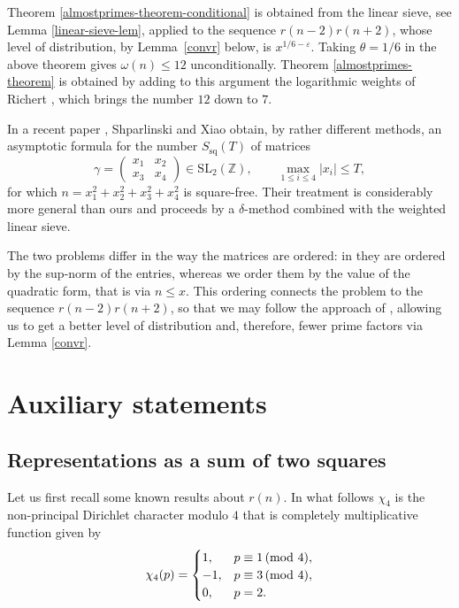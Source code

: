 \documentclass[12pt]{amsart}
\theoremstyle{remark}
\newcommand{\Z}{\mathbb{Z}}
\newcommand{\SL}{\mathrm{SL}}
\renewcommand{\pmod}[1]{\mkern3mu(\mathrm{mod}\ #1)}
\begin{document}
Theorem \ref{almostprimes-theorem-conditional} is obtained from the linear sieve, see Lemma \ref{linear-sieve-lem}, applied to the sequence $r(n-2)r(n+2)$, whose level of distribution, by Lemma~\ref{convr} below, is $x^{1/6-\varepsilon}$. Taking $\theta = 1/6$ in the above theorem gives $\omega(n) \le 12$ unconditionally.
Theorem \ref{almostprimes-theorem} is obtained by adding to this argument the logarithmic weights of Richert \cite{MR318083}, which brings the number $12$ down to $7$.

In a recent paper \cite{shp-xiao}, Shparlinski and Xiao obtain, by rather different methods, an asymptotic formula for the number $S_{\mathrm{sq}}(T)$ of
matrices
\[
    \gamma = \begin{pmatrix}x_1&x_2\\ x_3&x_4\end{pmatrix} \in \SL_2(\Z),
    \qquad \max_{1 \le i \le 4}|x_i| \le T,
\]
for which $n = x_1^2+x_2^2+x_3^2+x_4^2$ is square-free. Their treatment is
considerably more general than ours and proceeds by a $\delta$-method combined
with the weighted linear sieve.

The two problems differ in the way the matrices are ordered: in \cite{shp-xiao}
they are ordered by the sup-norm of the entries, whereas we order them by the value of the quadratic form, that is via $n \le x$. This ordering connects the problem to the sequence $r(n-2)r(n+2)$, so that we may follow the approach of \cite{MR2486486}, allowing us to get a better level of distribution and, therefore, fewer prime factors via Lemma \ref{convr}. 


\section{Auxiliary statements}

\subsection{Representations as a sum of two squares}

Let us first recall some known results about $r(n)$. 
In what follows $\chi_4$ is the non-principal Dirichlet character modulo $4$ that is completely multiplicative function given by
\[
	\chi_4(p) = \begin{cases}
					1, &p \equiv 1 \pmod 4,\\
					-1, &p \equiv 3 \pmod 4,\\
					0, &p=2.
				\end{cases}
\]
\end{document}
